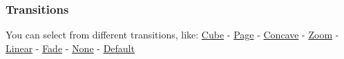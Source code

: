 \documentclass[xcolor=table]{beamer}
\begin{document}
\begin{mdframe}%

\frametitle{Transitions}\label{heading-transitions}%

\noindent{}You can select from different transitions, like:\mdbr
{}\href{?transition=cube\%23/transitions}{Cube} -
\href{?transition=page\%23/transitions}{Page} -
\href{?transition=concave\%23/transitions}{Concave} -
\href{?transition=zoom\%23/transitions}{Zoom} -
\href{?transition=linear\%23/transitions}{Linear} -
\href{?transition=fade\%23/transitions}{Fade} -
\href{?transition=none\%23/transitions}{None} -
\href{?\%23/transitions}{Default}%
\end{mdframe}\label{transitions}%
\end{document}
